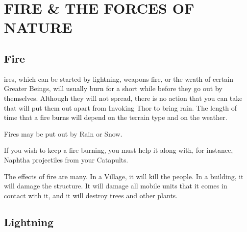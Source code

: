 
\chapter[Fire \& the Forces of Nature]{{\Huge F}IRE {\Huge \&} THE {\Huge F}ORCES OF {\Huge N}ATURE}

\section{\textsf{Fire}}


ires, which can be started by lightning, weapons fire, or the wrath of certain Greater Beings, will usually burn for a short while before they go out by themselves. Although they will not spread, there is no action that you can take that will put them out apart from Invoking Thor to bring rain. The length of time that a fire burns will depend on the terrain type and on the weather.

Fires may be put out by Rain or Snow.

If you wish to keep a fire burning, you must help it along with, for instance, Naphtha projectiles from your Catapults.

The effects of fire are many. In a Village, it will kill the people. In a building, it will damage the structure. It will damage all mobile units that it comes in contact with it, and it will destroy trees and other plants.

\section{\textsf{Lightning}}


